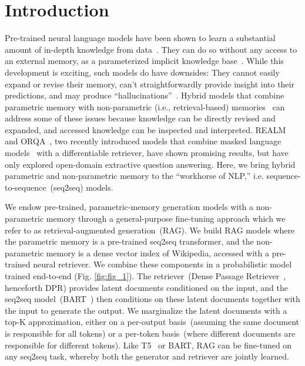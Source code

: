 \documentclass{article}
\begin{document}
\section{Introduction}
Pre-trained neural language models have been shown to learn a substantial amount of in-depth knowledge from data~\cite{petroni-etal-2019-language}. 
They can do so without any access to an external memory, as a parameterized implicit knowledge base~\cite{raffel2019t5,roberts2020t5cqba}. 
While this development is exciting, such models do have downsides: 
They cannot easily expand or revise their memory, can't straightforwardly provide insight into their predictions, and may produce ``hallucinations''~\cite{marcus2020next}.
Hybrid models that combine parametric memory with non-parametric (i.e., retrieval-based) memories~\cite{guu2020realm,Karpukhin20dense,petroni2020how} can address some of these issues because knowledge 
can be directly revised and expanded, and accessed knowledge can be inspected and interpreted. 
REALM~\cite{guu2020realm} and ORQA~\cite{lee-etal-2019-latent}, two recently introduced models that combine masked language models~\cite{devlin_bert:_2019} with a differentiable retriever, have shown promising results, but have only explored open-domain extractive question answering. 
Here, we bring hybrid parametric and non-parametric memory to the ``workhorse of NLP,'' i.e. sequence-to-sequence~(seq2seq) models.

We endow pre-trained, parametric-memory generation models with a non-parametric memory through a general-purpose fine-tuning approach which we refer to as retrieval-augmented generation~(RAG).
We build RAG models where the parametric memory is a pre-trained seq2seq transformer, and the non-parametric memory is a dense vector index of Wikipedia, accessed with a pre-trained neural retriever. We combine these components in a probabilistic model trained end-to-end (Fig. \ref{fig:fig_1}). The retriever~(Dense Passage Retriever~\cite{Karpukhin20dense}, henceforth DPR) provides latent documents conditioned on the input, and the seq2seq model~(BART~\cite{lewis2019bart}) then conditions on these latent documents together with the input to generate the output. 
We marginalize the latent documents with a top-K approximation, either on a per-output basis~(assuming the same document is responsible for all tokens) or a per-token basis~(where different documents are responsible for different tokens). Like T5~\cite{raffel2019t5} or BART, RAG can be fine-tuned on any seq2seq task, whereby both the generator and retriever are jointly learned. 
\end{document}

